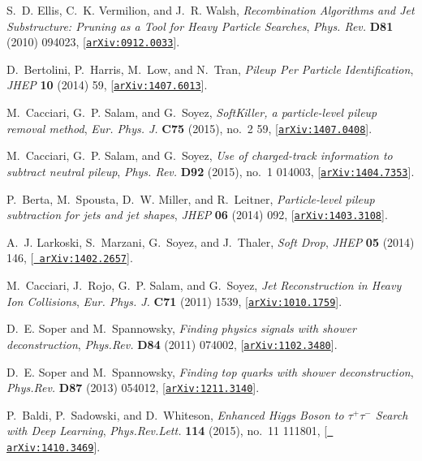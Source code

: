 \documentclass[a4paper,11pt]{article}
\begin{document}
\begin{thebibliography}{100}
S.~D. Ellis, C.~K. Vermilion, and J.~R. Walsh, {\it {Recombination Algorithms
  and Jet Substructure: Pruning as a Tool for Heavy Particle Searches}},  {\em
  Phys. Rev.} {\bf D81} (2010) 094023,
  [\href{http://arxiv.org/abs/0912.0033}{{\tt arXiv:0912.0033}}].

D.~Bertolini, P.~Harris, M.~Low, and N.~Tran, {\it {Pileup Per Particle
  Identification}},  {\em JHEP} {\bf 10} (2014) 59,
  [\href{http://arxiv.org/abs/1407.6013}{{\tt arXiv:1407.6013}}].

M.~Cacciari, G.~P. Salam, and G.~Soyez, {\it {SoftKiller, a particle-level
  pileup removal method}},  {\em Eur. Phys. J.} {\bf C75} (2015), no.~2 59,
  [\href{http://arxiv.org/abs/1407.0408}{{\tt arXiv:1407.0408}}].

M.~Cacciari, G.~P. Salam, and G.~Soyez, {\it {Use of charged-track information
  to subtract neutral pileup}},  {\em Phys. Rev.} {\bf D92} (2015), no.~1
  014003, [\href{http://arxiv.org/abs/1404.7353}{{\tt arXiv:1404.7353}}].

P.~Berta, M.~Spousta, D.~W. Miller, and R.~Leitner, {\it {Particle-level pileup
  subtraction for jets and jet shapes}},  {\em JHEP} {\bf 06} (2014) 092,
  [\href{http://arxiv.org/abs/1403.3108}{{\tt arXiv:1403.3108}}].

A.~J. Larkoski, S.~Marzani, G.~Soyez, and J.~Thaler, {\it {Soft Drop}},  {\em
  JHEP} {\bf 05} (2014) 146, [\href{http://arxiv.org/abs/1402.2657}{{\tt
  arXiv:1402.2657}}].

M.~Cacciari, J.~Rojo, G.~P. Salam, and G.~Soyez, {\it {Jet Reconstruction in
  Heavy Ion Collisions}},  {\em Eur. Phys. J.} {\bf C71} (2011) 1539,
  [\href{http://arxiv.org/abs/1010.1759}{{\tt arXiv:1010.1759}}].

D.~E. Soper and M.~Spannowsky, {\it {Finding physics signals with shower
  deconstruction}},  {\em Phys.Rev.} {\bf D84} (2011) 074002,
  [\href{http://arxiv.org/abs/1102.3480}{{\tt arXiv:1102.3480}}].

D.~E. Soper and M.~Spannowsky, {\it {Finding top quarks with shower
  deconstruction}},  {\em Phys.Rev.} {\bf D87} (2013) 054012,
  [\href{http://arxiv.org/abs/1211.3140}{{\tt arXiv:1211.3140}}].

P.~Baldi, P.~Sadowski, and D.~Whiteson, {\it {Enhanced Higgs Boson to
  $\tau^+\tau^-$ Search with Deep Learning}},  {\em Phys.Rev.Lett.} {\bf 114}
  (2015), no.~11 111801, [\href{http://arxiv.org/abs/1410.3469}{{\tt
  arXiv:1410.3469}}].


\end{thebibliography}
\end{document}
